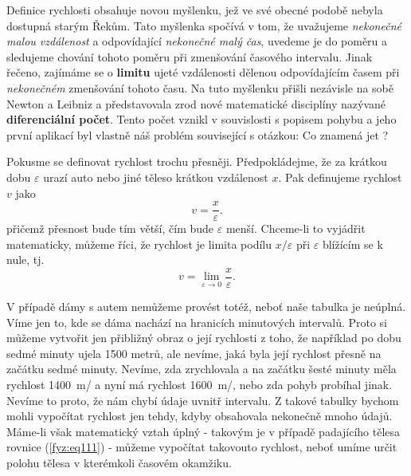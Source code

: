     Definice rychlosti obsahuje novou myšlenku, jež ve své obe\-cné podobě nebyla dostupná starým 
    Řekům. Tato myšlenka spočívá v tom, že uvažujeme \emph{nekonečné malou vzdálenost} a 
    odpovídající \emph{nekonečné malý čas}, uvedeme je do poměru a sledujeme chování tohoto poměru 
    při zmenšování časového intervalu. Jinak řečeno, zajímáme se o \textbf{limitu} ujeté 
    vzdálenosti dělenou odpovídajícím časem při \emph{nekonečném} zmenšování tohoto času. Na tuto 
    myšlenku přišli nezávisle na sobě Newton a Leibniz a představovala zrod nové matematické 
    disciplíny nazývané \textbf{diferenciální počet}. Tento počet vznikl v souvislosti s popisem 
    pohybu a jeho první aplikací byl vlastně náš problém související s otázkou: Co znamená jet 
    ?

    Pokusme se definovat rychlost trochu přesněji. Předpokládejme, že za krátkou dobu 
    \(\varepsilon\) urazí auto nebo jiné těleso krátkou vzdálenost \(x\). Pak definujeme rychlost 
    \(v\) jako
    \begin{equation}\label{fyz:eq113}
      v = \frac{x}{\varepsilon}.
    \end{equation}
    přičemž přesnost bude tím větší, čím bude \(\varepsilon\) menší. Chceme-li to vyjádřit 
    matematicky, můžeme říci, že rychlost je limita podílu \(x/\varepsilon\) při \(\varepsilon\) 
    blížícím se k nule, tj.
    \begin{equation}\label{fyz:eq114}
      v = \lim_{\varepsilon\to 0}{\frac{x}{\varepsilon}}.
    \end{equation}
    
    V případě dámy s autem nemůžeme provést totéž, neboť naše tabulka je neúplná. Víme jen to, kde 
    se dáma nachází na hranicích minutových intervalů. Proto si můžeme vytvořit jen přibližný obraz 
    o její rychlosti z toho, že například po dobu sedmé minuty ujela \num{1500} metrů, ale nevíme, 
    jaká byla její rychlost přesně na začátku sedmé minuty. Nevíme, zda zrychlovala a na začátku 
    šesté minuty měla rychlost \qty{1400}{\m/\min} a nyní má rychlost \qty{1600}{\m/\min}, nebo zda 
    pohyb probíhal jinak. Nevíme to proto, že nám chybí údaje uvnitř intervalu. Z takové tabulky 
    bychom mohli vypočítat rychlost jen tehdy, kdyby obsahovala nekonečně mnoho údajů. Máme-li však 
    matematický vztah úplný - takovým je v případě padajícího tělesa rovnice (\ref{fyz:eq111}) - 
    můžeme vypočítat takovouto rychlost, neboť umíme určit polohu tělesa v kterémkoli časovém 
    okamžiku.
    
